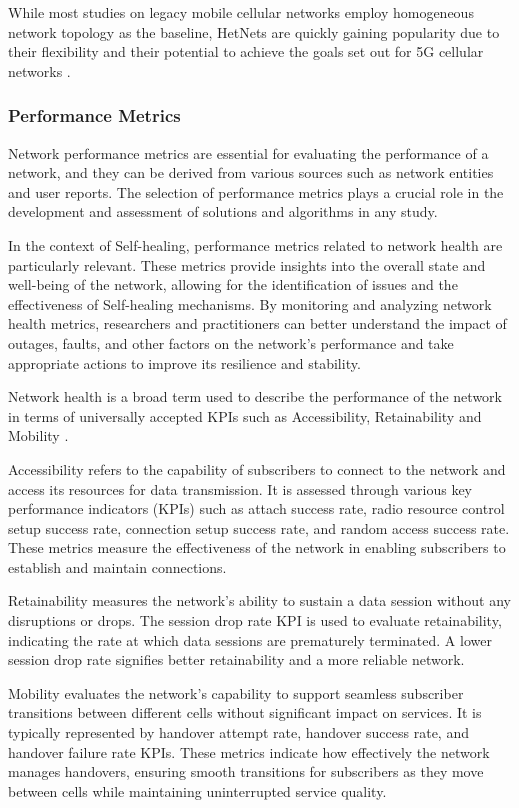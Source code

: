 While most studies on legacy mobile cellular networks employ homogeneous network topology as the baseline, HetNets are quickly gaining popularity due to their flexibility and their potential to achieve the goals set out for 5G cellular networks \cite{andrews2014will}.

\subsubsection{Performance Metrics}

Network performance metrics are essential for evaluating the performance of a network, and they can be derived from various sources such as network entities and user reports. The selection of performance metrics plays a crucial role in the development and assessment of solutions and algorithms in any study.

In the context of Self-healing, performance metrics related to network health are particularly relevant. These metrics provide insights into the overall state and well-being of the network, allowing for the identification of issues and the effectiveness of Self-healing mechanisms. By monitoring and analyzing network health metrics, researchers and practitioners can better understand the impact of outages, faults, and other factors on the network's performance and take appropriate actions to improve its resilience and stability.

Network health is a broad term used to describe the performance of the network in terms of universally accepted KPIs such as Accessibility, Retainability and Mobility \cite{andrews2014will}.

Accessibility refers to the capability of subscribers to connect to the network and access its resources for data transmission. It is assessed through various key performance indicators (KPIs) such as attach success rate, radio resource control setup success rate, connection setup success rate, and random access success rate. These metrics measure the effectiveness of the network in enabling subscribers to establish and maintain connections.

Retainability measures the network's ability to sustain a data session without any disruptions or drops. The session drop rate KPI is used to evaluate retainability, indicating the rate at which data sessions are prematurely terminated. A lower session drop rate signifies better retainability and a more reliable network.

Mobility evaluates the network's capability to support seamless subscriber transitions between different cells without significant impact on services. It is typically represented by handover attempt rate, handover success rate, and handover failure rate KPIs. These metrics indicate how effectively the network manages handovers, ensuring smooth transitions for subscribers as they move between cells while maintaining uninterrupted service quality.

